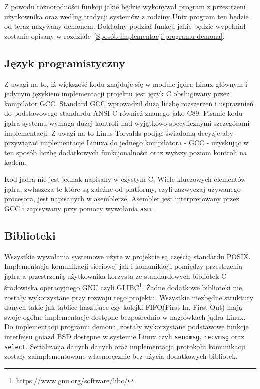 \documentclass[10pt]{scrartcl}
\begin{document}
Z powodu różnorodności funkcji jakie będzie wykonywał program z przestrzeni użytkownika oraz według tradycji systemów z rodziny Unix program ten będzie od teraz nazywany demonem. Dokładny podział funkcji jakie będzie wypełniał zostanie opisany w rozdziale~\ref{Sposób implementacji programu demona}.

\subsection{Język programistyczny}
\label{language}

Z uwagi na to, iż większość kodu znajduje się w module jądra Linux głównym i jedynym językiem implementacji projektu jest język C obsługiwany przez kompilator GCC\@. Standard GCC wprowadził dużą liczbę rozszerzeń i usprawnień do podstawowego standardu ANSI C również znanego jako C89. Pisanie kodu jądra systemu wymaga dużej kontroli nad wyjątkowo specyficznymi szczegółami implementacji. Z uwagi na to Linus Torvalds podjął świadomą decyzje aby przywiązać implementacje Linuxa do jednego kompilatora - GCC - uzyskując w ten sposób liczbę dodatkowych funkcjonalności\cite{gccextensions} oraz wyższy poziom kontroli na kodem.

Kod jadra nie jest jednak napisany w czystym C. Wiele kluczowych elementów jądra, zwłaszcza te które są zależne od platformy, czyli zazwyczaj używanego procesora, jest napisanych w asemblerze. Asembler jest interpretowany przez GCC i zapisywany przy pomocy wywołania \texttt{asm}\cite{asm}.

\subsection{Biblioteki}
\label{libraries}

Wszystkie wywołania systemowe użyte w projekcie są częścią standardu POSIX\@. Implementacja komunikacji sieciowej jak i komunikacji pomiędzy przestrzenią jądra a przestrzenią użytkownika korzysta ze standardowych bibliotek C środowiska operacyjnego GNU czyli GLIBC\footnote{https://www.gnu.org/software/libc/}. Żadne dodatkowe biblioteki nie zostały wykorzystane przy rozwoju tego projektu.  Wszystkie niezbędne struktury danych takie jak tablice haszujące czy kolejki FIFO(First In, First Out) mają swoje ogólne implementacje dostępne bezpośrednio w nagłówkach jądra Linux. Do implementacji programu demona, zostały wykorzystane podstawowe funkcje interfejsu gniazd BSD dostępne w systemie Linux czyli \texttt{sendmsg}, \texttt{recvmsg} oraz \texttt{select}. Serializacja danych danych oraz implementacja protokołu komunikacji zostały zaimplementowane własnoręcznie bez użycia dodatkowych bibliotek.
\end{document}
